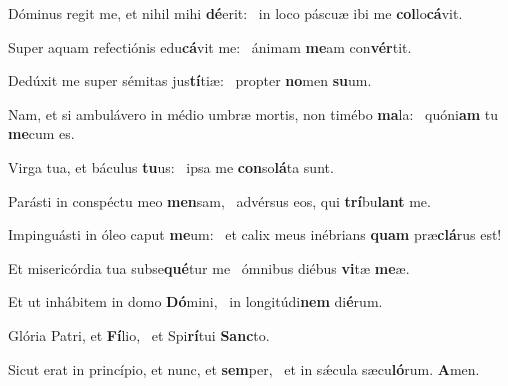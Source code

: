 \item Dóminus regit me, et nihil mihi \textbf{dé}erit:~\psstar{} in loco páscuæ ibi me \textbf{col}lo\textbf{cá}vit.
\item Super aquam refectiónis edu\textbf{cá}vit me:~\psstar{} ánimam \textbf{me}am con\textbf{vér}tit.
\item Dedúxit me super sémitas jus\textbf{tí}tiæ:~\psstar{} propter \textbf{no}men \textbf{su}um.
\item Nam, et si ambulávero in médio umbræ mortis, non timébo \textbf{ma}la:~\psstar{} quóni\textbf{am} tu \textbf{me}cum es.
\item Virga tua, et báculus \textbf{tu}us:~\psstar{} ipsa me \textbf{con}so\textbf{lá}ta sunt.
\item Parásti in conspéctu meo \textbf{men}sam,~\psstar{} advérsus eos, qui \textbf{trí}bu\textbf{lant} me.
\item Impinguásti in óleo caput \textbf{me}um:~\psstar{} et calix meus inébrians \textbf{quam} præ\textbf{clá}rus est!
\item Et misericórdia tua subse\textbf{qué}\-tur me~\psstar{} ómnibus diébus \textbf{vi}tæ \textbf{me}æ.
\item Et ut inhábitem in domo \textbf{Dó}mini,~\psstar{} in longitúdi\textbf{nem} di\textbf{é}rum.
\item Glória Patri, et \textbf{Fí}lio,~\psstar{} et Spi\textbf{rí}tui \textbf{Sanc}to.
\item Sicut erat in princípio, et nunc, et \textbf{sem}per,~\psstar{} et in sǽcula sæcu\textbf{ló}rum. \textbf{A}men.
